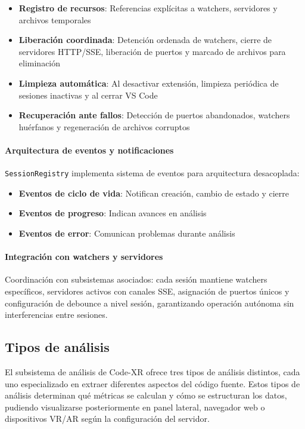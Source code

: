 \documentclass[a4paper, 12pt]{book}
\begin{document}
\begin{itemize}
  \item \textbf{Registro de recursos}: Referencias explícitas a watchers, servidores y archivos temporales
  \item \textbf{Liberación coordinada}: Detención ordenada de watchers, cierre de servidores HTTP/SSE, liberación de puertos y marcado de archivos para eliminación
  \item \textbf{Limpieza automática}: Al desactivar extensión, limpieza periódica de sesiones inactivas y al cerrar VS Code
  \item \textbf{Recuperación ante fallos}: Detección de puertos abandonados, watchers huérfanos y regeneración de archivos corruptos
\end{itemize}

\paragraph{Arquitectura de eventos y notificaciones}
\texttt{SessionRegistry} implementa sistema de eventos para arquitectura desacoplada:

\begin{itemize}
  \item \textbf{Eventos de ciclo de vida}: Notifican creación, cambio de estado y cierre
  \item \textbf{Eventos de progreso}: Indican avances en análisis
  \item \textbf{Eventos de error}: Comunican problemas durante análisis
\end{itemize}

\paragraph{Integración con watchers y servidores}
Coordinación con subsistemas asociados: cada sesión mantiene watchers específicos, servidores activos con canales SSE, asignación de puertos únicos y configuración de debounce a nivel sesión, garantizando operación autónoma sin interferencias entre sesiones.

\subsection{Tipos de análisis}
\label{sec:tipos-analisis}

El subsistema de análisis de Code-XR ofrece tres tipos de análisis distintos, cada uno especializado en extraer diferentes aspectos del código fuente. Estos tipos de análisis determinan qué métricas se calculan y cómo se estructuran los datos, pudiendo visualizarse posteriormente en panel lateral, navegador web o dispositivos VR/AR según la configuración del servidor.
\end{document}
